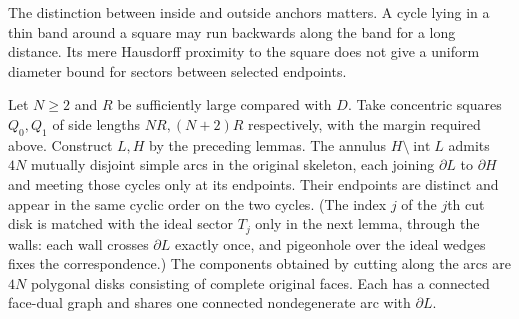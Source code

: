 The distinction between inside and outside anchors matters.  A cycle lying
in a thin band around a square may run backwards along the band for a long
distance.  Its mere Hausdorff proximity to the square does not give a
uniform diameter bound for sectors between selected endpoints.

\begin{lemma}
\label{lem:annular-spokes}
Let $N\ge2$ and $R$ be sufficiently large compared with $D$.  Take concentric
squares $Q_0,Q_1$ of side lengths $NR,(N+2)R$ respectively, with the margin
required above.  Construct $L,H$ by the preceding lemmas.  The annulus
$H\setminus\operatorname{int}L$ admits $4N$ mutually disjoint simple arcs
in the original skeleton, each joining $\partial L$ to $\partial H$ and
meeting those cycles only at its endpoints.  Their endpoints are distinct
and appear in the same cyclic order on the two cycles.  (The index $j$ of
the $j$th cut disk is matched with the ideal sector $T_j$ only in the next
lemma, through the walls: each wall crosses $\partial L$ exactly once, and
pigeonhole over the ideal wedges fixes the correspondence.)  The components
obtained by cutting along the arcs are $4N$ polygonal disks consisting of
complete original faces.  Each has a connected face-dual graph and shares
one connected nondegenerate arc with $\partial L$.
\end{lemma}

